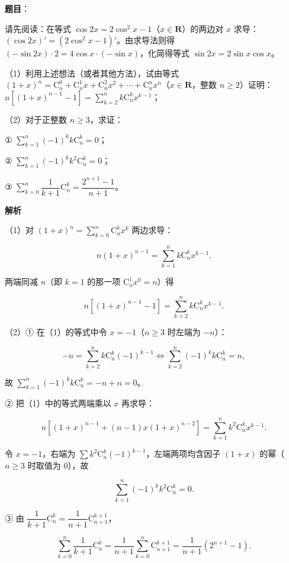 \begin{answer}

\textbf{题目}：

请先阅读：在等式 $\cos2x=2\cos^2x-1$（$x\in\mathbf R$）的两边对 $x$ 求导：$(\cos2x)'=(2\cos^2x-1)'$。由求导法则得 $(-\sin2x)\cdot2=4\cos x\cdot(-\sin x)$，化简得等式 $\sin2x=2\sin x\cos x$。

（1）利用上述想法（或者其他方法），试由等式 $(1+x)^n=\mathrm C_n^0+\mathrm C_n^1x+\mathrm C_n^2x^2+\cdots+\mathrm C_n^nx^n$（$x\in\mathbf R$，整数 $n\geqslant2$）证明：$n\left[(1+x)^{n-1}-1\right]=\sum\limits_{k=2}^nk\mathrm C_n^kx^{k-1}$；

（2）对于正整数 $n\geqslant3$，求证：

① $\sum\limits_{k=1}^n(-1)^kk\mathrm C_n^k=0$；

② $\sum\limits_{k=1}^n(-1)^kk^2\mathrm C_n^k=0$；

③ $\sum\limits_{k=0}^n\dfrac1{k+1}\mathrm C_n^k=\dfrac{2^{n+1}-1}{n+1}$。

\textbf{解析}

（1）对 $(1+x)^n=\sum\limits_{k=0}^n\mathrm C_n^kx^k$ 两边求导：

\nopagebreak[4]
\[n(1+x)^{n-1}=\sum_{k=1}^nk\mathrm C_n^kx^{k-1}.\]

两端同减 $n$（即 $k=1$ 的那一项 $\mathrm C_n^1x^0=n$）得

\nopagebreak[4]
\[n\left[(1+x)^{n-1}-1\right]=\sum_{k=2}^nk\mathrm C_n^kx^{k-1}.\]

（2）① 在（1）的等式中令 $x=-1$（$n\geqslant3$ 时左端为 $-n$）：

\nopagebreak[4]
\[-n=\sum_{k=2}^nk\mathrm C_n^k(-1)^{k-1}\iff\sum_{k=2}^n(-1)^kk\mathrm C_n^k=n,\]

故 $\sum\limits_{k=1}^n(-1)^kk\mathrm C_n^k=-n+n=0$。

② 把（1）中的等式两端乘以 $x$ 再求导：

\nopagebreak[4]
\[n\left[(1+x)^{n-1}+(n-1)x(1+x)^{n-2}\right]=\sum_{k=1}^nk^2\mathrm C_n^kx^{k-1}.\]

令 $x=-1$，右端为 $\sum k^2\mathrm C_n^k(-1)^{k-1}$，左端两项均含因子 $(1+x)$ 的幂（$n\geqslant3$ 时取值为 $0$），故

\nopagebreak[4]
\[\sum_{k=1}^n(-1)^kk^2\mathrm C_n^k=0.\]

③ 由 $\dfrac1{k+1}\mathrm C_n^k=\dfrac1{n+1}\mathrm C_{n+1}^{k+1}$，

\nopagebreak[4]
\[\sum_{k=0}^n\frac1{k+1}\mathrm C_n^k=\frac1{n+1}\sum_{k=0}^n\mathrm C_{n+1}^{k+1}=\frac1{n+1}\left(2^{n+1}-1\right).\]


\end{answer}
